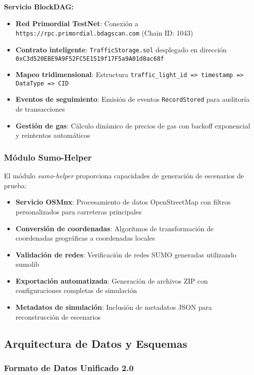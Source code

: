 \documentclass[onecolumn]{article}
\begin{document}
\textbf{Servicio BlockDAG:}
\begin{itemize}
    \item \textbf{Red Primordial TestNet}: Conexión a \texttt{https://rpc.primordial.bdagscan.com} (Chain ID: 1043)
    \item \textbf{Contrato inteligente}: \texttt{TrafficStorage.sol} desplegado en dirección \texttt{0xC3d520EBE9A9F52FC5E1519f17F5a9A01d8ac68f}
    \item \textbf{Mapeo tridimensional}: Estructura \texttt{traffic\_light\_id => timestamp => DataType => CID}
    \item \textbf{Eventos de seguimiento}: Emisión de eventos \texttt{RecordStored} para auditoría de transacciones
    \item \textbf{Gestión de gas}: Cálculo dinámico de precios de gas con backoff exponencial y reintentos automáticos
\end{itemize}

\subsubsection{Módulo Sumo-Helper}

El módulo \textit{sumo-helper} proporciona capacidades de generación de escenarios de prueba:

\begin{itemize}
    \item \textbf{Servicio OSMnx}: Procesamiento de datos OpenStreetMap con filtros personalizados para carreteras principales
    \item \textbf{Conversión de coordenadas}: Algoritmos de transformación de coordenadas geográficas a coordenadas locales
    \item \textbf{Validación de redes}: Verificación de redes SUMO generadas utilizando sumolib
    \item \textbf{Exportación automatizada}: Generación de archivos ZIP con configuraciones completas de simulación
    \item \textbf{Metadatos de simulación}: Inclusión de metadatos JSON para reconstrucción de escenarios
\end{itemize}

\subsection{Arquitectura de Datos y Esquemas}

\subsubsection{Formato de Datos Unificado 2.0}
\end{document}

